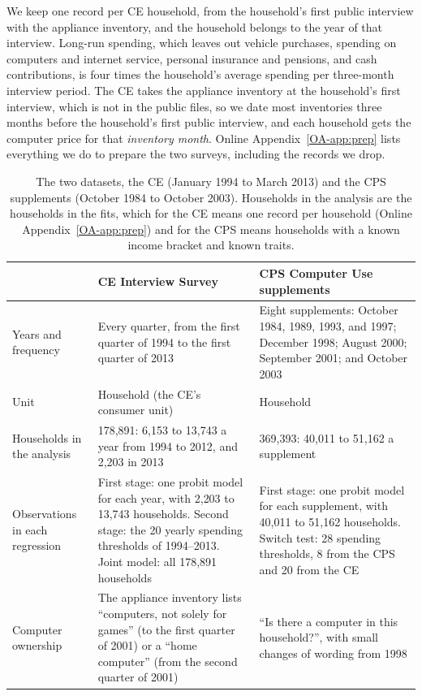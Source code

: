 \documentclass[11pt]{article}
\begin{document}
We keep one record per CE household, from the household's first public interview with the appliance inventory, and the household belongs to the year of that interview. Long-run spending, which leaves out vehicle purchases, spending on computers and internet service, personal insurance and pensions, and cash contributions, is four times the household's average spending per three-month interview period. The CE takes the appliance inventory at the household's first interview, which is not in the public files, so we date most inventories three months before the household's first public interview, and each household gets the computer price for that \emph{inventory month}. Online Appendix~\ref{OA-app:prep} lists everything we do to prepare the two surveys, including the records we drop.

\begin{table}[t]
\centering
\caption{The two datasets, the CE (January 1994 to March 2013) and the CPS supplements (October 1984 to October 2003). Households in the analysis are the households in the fits, which for the CE means one record per household (Online Appendix~\ref{OA-app:prep}) and for the CPS means households with a known income bracket and known traits.}
\label{tab:data}
\small
\begin{tabular}{L{0.18\textwidth}L{0.38\textwidth}L{0.35\textwidth}}
\toprule
 & CE Interview Survey & CPS Computer Use supplements \\
\midrule
Years and frequency & Every quarter, from the first quarter of 1994 to the first quarter of 2013 & Eight supplements: October 1984, 1989, 1993, and 1997; December 1998; August 2000; September 2001; and October 2003 \\
\addlinespace
Unit & Household (the CE's consumer unit) & Household \\
\addlinespace
Households in the analysis & 178{,}891: 6{,}153 to 13{,}743 a year from 1994 to 2012, and 2{,}203 in 2013 & 369{,}393: 40{,}011 to 51{,}162 a supplement \\
\addlinespace
Observations in each regression & First stage: one probit model for each year, with 2{,}203 to 13{,}743 households. Second stage: the 20 yearly spending thresholds of 1994--2013. Joint model: all 178{,}891 households & First stage: one probit model for each supplement, with 40{,}011 to 51{,}162 households. Switch test: 28 spending thresholds, 8 from the CPS and 20 from the CE \\
\addlinespace
Computer ownership & The appliance inventory lists ``computers, not solely for games'' (to the first quarter of 2001) or a ``home computer'' (from the second quarter of 2001) & ``Is there a computer in this household?'', with small changes of wording from 1998 \\

\end{tabular}
\end{table}
\end{document}
